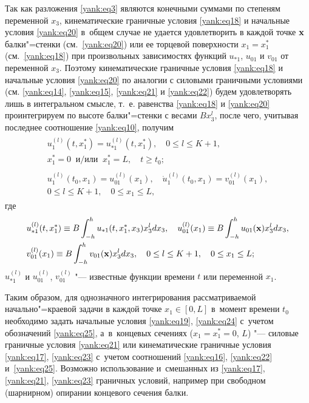 Так как разложения \eqref{yank:eq3} являются конечными суммами по степеням переменной
$x_3$, кинематические граничные условия \eqref{yank:eq18} и начальные условия \eqref{yank:eq20} в~общем случае не удается удовлетворить в каждой точке $\bf{x}$ балки"=стенки
(см.~\eqref{yank:eq20}) или ее торцевой поверхности $x_1 =x_1^\ast $ (см.~\eqref{yank:eq18}) при
произвольных зависимостях функций $u_{\ast 1}$, $u_{01}$ и $v_{01}$ от
переменной $x_3$. Поэтому кинематические граничные условия \eqref{yank:eq18} и начальные
условия \eqref{yank:eq20} по аналогии с силовыми граничными условиями (см. \eqref{yank:eq14}, \eqref{yank:eq15},
\eqref{yank:eq21} и \eqref{yank:eq22}) будем удовлетворять лишь в интегральном смысле, т.~е. равенства
\eqref{yank:eq18} и \eqref{yank:eq20} проинтегрируем по высоте балки"=стенки с весами $Bx_3^l$, после
чего, учитывая последнее соотношение \eqref{yank:eq10}, получим
\begin{gather}
\label{yank:eq23}
\begin{array}{c}
u_1^{(l)} (t,x_1^\ast )=u_{\ast 1}^{(l)} (t,x_1^\ast ),\quad 0 \le l\le K+1,\\[2mm]
x_1^\ast =0 ~ \text{~и/или~} ~ x_1^\ast=L,\quad t\ge t_0;
\end{array}
\\
\label{yank:eq24}
\begin{array}{c}
u_1^{(l)} (t_0,x_1)=u_{01}^{(l)} (x_1),\quad \dot {u}_1^{(l)} (t_0,x_1)=v_{01}^{(l)} (x_1),\\[2mm]
0\le l\le K+1,\quad 0\le x_1 \le L,
\end{array}
\end{gather}
где
\begin{equation}
\label{yank:eq25}
\begin{aligned}
& u_{\ast 1}^{(l)} (t,x_1^\ast )\equiv B\int _{-h}^h u_{\ast 1} (t,x_1^\ast,x_3 )x_3^l dx_3,\quad 
u_{01}^{(l)} (x_1)\equiv B\int _{-h}^h u_{01} ({\bf x})x_3^l dx_3, \\
& v_{01}^{(l)} (x_1 )\equiv B\int _{-h}^h v_{01} ({\bf x})x_3^l dx_3,\quad 0\le l\le K+1,\quad 0\le x_1 \le L;
\end{aligned}
\end{equation}
$u_{\ast 1}^{(l)}$ и $u_{01}^{(l)}$, $v_{01}^{(l)} $ "--- известные функции времени $t$ или переменной $x_1$.

Таким образом, для однозначного интегрирования рассматриваемой начально"=краевой задачи в каждой точке $x_1 \in [0,L]$ в~момент времени $t_0$ необходимо задать начальные условия \eqref{yank:eq19}, \eqref{yank:eq24} с~учетом обозначений \eqref{yank:eq25}, а~в~концевых сечениях ($x_1 =x_1^\ast =0$, $L$) "--- силовые граничные условия \eqref{yank:eq21} или кинематические граничные условия \eqref{yank:eq17}, \eqref{yank:eq23} с~учетом соотношений \eqref{yank:eq16}, \eqref{yank:eq22} и~\eqref{yank:eq25}. 
Возможно использование и~смешанных из \eqref{yank:eq17}, \eqref{yank:eq21}, \eqref{yank:eq23} граничных условий, например при свободном (шарнирном) опирании концевого сечения балки.

